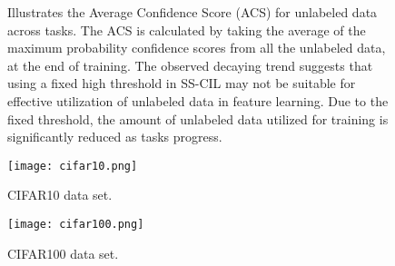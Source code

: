 \documentclass{article}
\begin{document}
\begin{figure}[h]
    \centering
    \captionsetup{justification=centering}
    \caption{Illustrates the Average Confidence Score (ACS) for unlabeled data across tasks. The ACS is calculated by taking the average of the maximum probability confidence scores from all the unlabeled data, at the end of training. The observed decaying trend suggests that using a fixed high threshold in SS-CIL may not be suitable for effective utilization of unlabeled data in feature learning. Due to the fixed threshold, the amount of unlabeled data utilized for training is significantly reduced as tasks progress.}
\end{figure}

\begin{figure}[h]
    \centering
    \texttt{[image: cifar10.png]}
    \caption{CIFAR10 data set.}
\end{figure}

\begin{figure}[h]
    \centering
    \texttt{[image: cifar100.png]}
    \caption{CIFAR100 data set.}
\end{figure}
\end{document}
